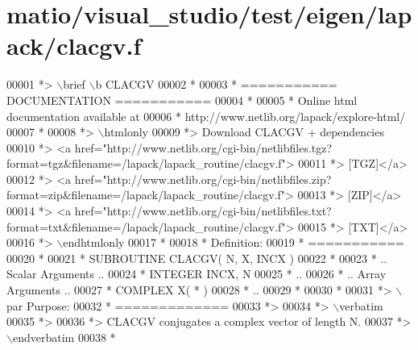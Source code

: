 \hypertarget{matio_2visual__studio_2test_2eigen_2lapack_2clacgv_8f_source}{}\section{matio/visual\+\_\+studio/test/eigen/lapack/clacgv.f}
\label{matio_2visual__studio_2test_2eigen_2lapack_2clacgv_8f_source}

\begin{DoxyCode}
00001 \textcolor{comment}{*> \(\backslash\)brief \(\backslash\)b CLACGV}
00002 \textcolor{comment}{*}
00003 \textcolor{comment}{*  =========== DOCUMENTATION ===========}
00004 \textcolor{comment}{*}
00005 \textcolor{comment}{* Online html documentation available at }
00006 \textcolor{comment}{*            http://www.netlib.org/lapack/explore-html/ }
00007 \textcolor{comment}{*}
00008 \textcolor{comment}{*> \(\backslash\)htmlonly}
00009 \textcolor{comment}{*> Download CLACGV + dependencies }
00010 \textcolor{comment}{*> <a
       href="http://www.netlib.org/cgi-bin/netlibfiles.tgz?format=tgz&filename=/lapack/lapack\_routine/clacgv.f"> }
00011 \textcolor{comment}{*> [TGZ]</a> }
00012 \textcolor{comment}{*> <a
       href="http://www.netlib.org/cgi-bin/netlibfiles.zip?format=zip&filename=/lapack/lapack\_routine/clacgv.f"> }
00013 \textcolor{comment}{*> [ZIP]</a> }
00014 \textcolor{comment}{*> <a
       href="http://www.netlib.org/cgi-bin/netlibfiles.txt?format=txt&filename=/lapack/lapack\_routine/clacgv.f"> }
00015 \textcolor{comment}{*> [TXT]</a>}
00016 \textcolor{comment}{*> \(\backslash\)endhtmlonly }
00017 \textcolor{comment}{*}
00018 \textcolor{comment}{*  Definition:}
00019 \textcolor{comment}{*  ===========}
00020 \textcolor{comment}{*}
00021 \textcolor{comment}{*       SUBROUTINE CLACGV( N, X, INCX )}
00022 \textcolor{comment}{* }
00023 \textcolor{comment}{*       .. Scalar Arguments ..}
00024 \textcolor{comment}{*       INTEGER            INCX, N}
00025 \textcolor{comment}{*       ..}
00026 \textcolor{comment}{*       .. Array Arguments ..}
00027 \textcolor{comment}{*       COMPLEX            X( * )}
00028 \textcolor{comment}{*       ..}
00029 \textcolor{comment}{*  }
00030 \textcolor{comment}{*}
00031 \textcolor{comment}{*> \(\backslash\)par Purpose:}
00032 \textcolor{comment}{*  =============}
00033 \textcolor{comment}{*>}
00034 \textcolor{comment}{*> \(\backslash\)verbatim}
00035 \textcolor{comment}{*>}
00036 \textcolor{comment}{*> CLACGV conjugates a complex vector of length N.}
00037 \textcolor{comment}{*> \(\backslash\)endverbatim}
00038 \textcolor{comment}{*}

\end{DoxyCode}
